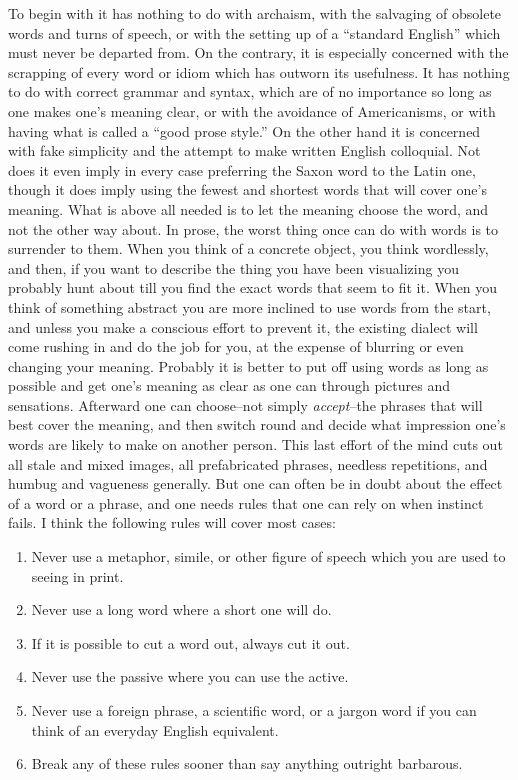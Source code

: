 \documentclass[a4paper]{article}
\begin{document}
To begin with it has nothing to do with archaism, with the salvaging of obsolete words and turns of speech, or with the setting up of a ``standard English'' which must never be departed from. On the contrary, it is especially concerned with the scrapping of every word or idiom which has outworn its usefulness. It has nothing to do with correct grammar and syntax, which are of no importance so long as one makes one's meaning clear, or with the avoidance of Americanisms, or with having what is called a ``good prose style.'' On the other hand it is concerned with fake simplicity and the attempt to make written English colloquial. Not does it even imply in every case preferring the Saxon word to the Latin one, though it does imply using the fewest and shortest words that will cover one's meaning. What is above all needed is to let the meaning choose the word, and not the other way about. In prose, the worst thing once can do with words is to surrender to them. When you think of a concrete object, you think wordlessly, and then, if you want to describe the thing you have been visualizing you probably hunt about till you find the exact words that seem to fit it. When you think of something abstract you are more inclined to use words from the start, and unless you make a conscious effort to prevent it, the existing dialect will come rushing in and do the job for you, at the expense of blurring or even changing your meaning. Probably it is better to put off using words as long as possible and get one's meaning as clear as one can through pictures and sensations. Afterward one can choose--not simply \textit{accept}--the phrases that will best cover the meaning, and then switch round and decide what impression one's words are likely to make on another person. This last effort of the mind cuts out all stale and mixed images, all prefabricated phrases, needless repetitions, and humbug and vagueness generally. But one can often be in doubt about the effect of a word or a phrase, and one needs rules that one can rely on when instinct fails. I think the following rules will cover most cases:

\begin{enumerate}
 \item Never use a metaphor, simile, or other figure of speech which you are used to seeing in print.
 
 \item Never use a long word where a short one will do.
 
 \item If it is possible to cut a word out, always cut it out.
 
 \item Never use the passive where you can use the active.
 
 \item Never use a foreign phrase, a scientific word, or a jargon word if you can think of an everyday English equivalent.
 
 \item Break any of these rules sooner than say anything outright barbarous.
\end{enumerate}
\end{document}
